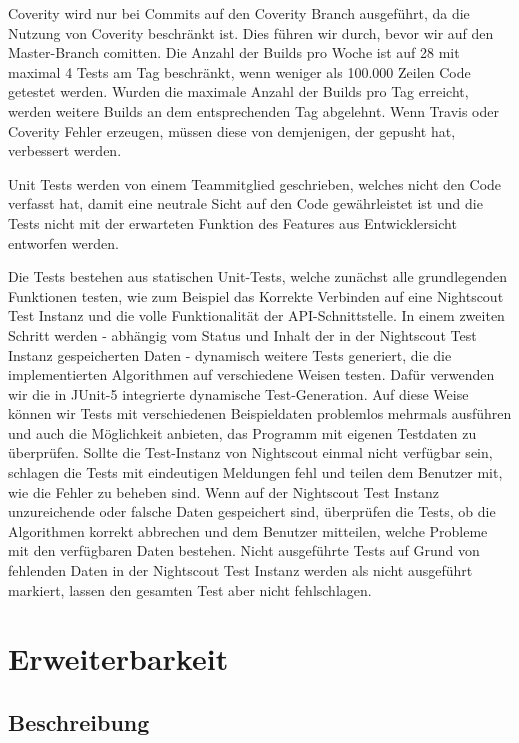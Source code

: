 \documentclass[accentcolor=tud0b,12pt,paper=a4]{tudreport}
\begin{document}
Coverity wird nur bei Commits auf den Coverity Branch ausgeführt, da die Nutzung von Coverity beschränkt ist. Dies führen wir durch, bevor wir auf den Master-Branch comitten. Die Anzahl der Builds pro Woche ist auf 28 mit maximal 4 Tests am Tag beschränkt, wenn weniger als 100.000 Zeilen Code getestet werden. Wurden die maximale Anzahl der Builds pro Tag erreicht, werden weitere Builds an dem entsprechenden Tag abgelehnt. Wenn Travis oder Coverity Fehler erzeugen, müssen diese von demjenigen, der gepusht hat, verbessert werden. 

Unit Tests werden von einem Teammitglied geschrieben, welches nicht den Code verfasst hat, damit eine neutrale Sicht auf den Code gewährleistet ist und die Tests nicht mit der erwarteten Funktion des Features aus Entwicklersicht entworfen werden.

Die Tests bestehen aus statischen Unit-Tests, welche zunächst alle grundlegenden Funktionen testen, wie zum Beispiel das Korrekte Verbinden auf eine Nightscout Test Instanz und die volle Funktionalität der API-Schnittstelle. In einem zweiten Schritt werden - abhängig vom Status und Inhalt der in der Nightscout Test Instanz gespeicherten Daten - dynamisch weitere Tests generiert, die die implementierten Algorithmen auf verschiedene Weisen testen. Dafür verwenden wir die in JUnit-5 integrierte dynamische Test-Generation. Auf diese Weise können wir Tests mit verschiedenen Beispieldaten problemlos mehrmals ausführen und auch die Möglichkeit anbieten, das Programm mit eigenen Testdaten zu überprüfen. Sollte die Test-Instanz von Nightscout einmal nicht verfügbar sein, schlagen die Tests mit eindeutigen Meldungen fehl und teilen dem Benutzer mit, wie die Fehler zu beheben sind. Wenn auf der Nightscout Test Instanz unzureichende oder falsche Daten gespeichert sind, überprüfen die Tests, ob die Algorithmen korrekt abbrechen und dem Benutzer mitteilen, welche Probleme mit den verfügbaren Daten bestehen. Nicht ausgeführte Tests auf Grund von fehlenden Daten in der Nightscout Test Instanz  werden als nicht ausgeführt markiert, lassen den gesamten Test aber nicht fehlschlagen.

\newpage

\section{Erweiterbarkeit}

\subsection{Beschreibung}
\end{document}
